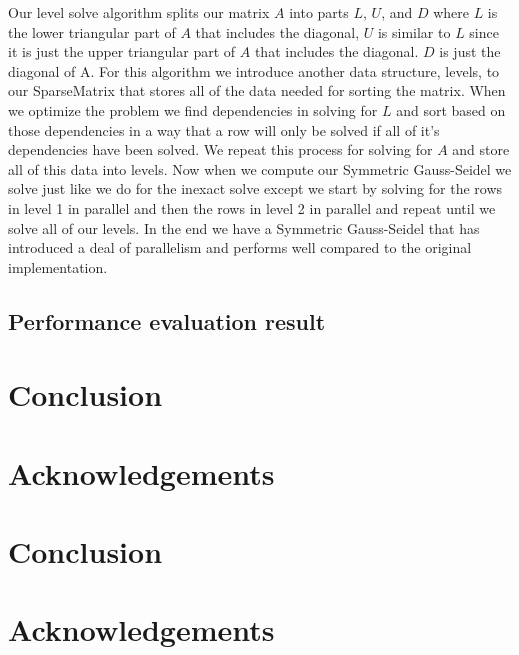 \documentclass{ccr15}
\begin{document}
Our level solve algorithm splits our matrix $A$ into parts $L$, $U$, and $D$ where $L$ is the
lower triangular part of $A$ that includes the diagonal, $U$ is similar to $L$ since it is just
the upper triangular part of $A$ that includes the diagonal. $D$ is just the diagonal of A. For
this algorithm we introduce another data structure, levels, to our SparseMatrix that stores all 
of the data needed for sorting the matrix. When we optimize the problem we find dependencies in
solving for $L$ and sort based on those dependencies in a way that a row will only be solved if
all of it's dependencies have been solved. We repeat this process for solving for $A$ and store
all of this data into levels. Now when we compute our Symmetric Gauss-Seidel we solve just like
we do for the inexact solve except we start by solving for the rows in level 1 in parallel and
then the rows in level 2 in parallel and repeat until we solve all of our levels. In the end we
have a Symmetric Gauss-Seidel that has introduced a deal of parallelism and performs well
compared to the original implementation.

\subsection{Performance evaluation result}
\section{Conclusion}
\section{Acknowledgements}

\section{Conclusion}

\section{Acknowledgements}
\end{document}
